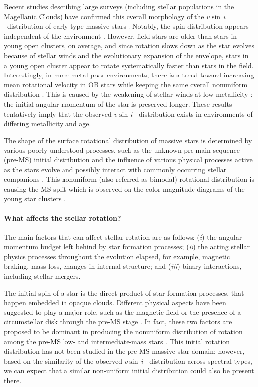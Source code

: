 \documentclass{aa}
\newcommand{\vsini} {$v\sin\,i$}
\begin{document}
Recent studies describing large surveys (including stellar
populations in the Magellanic Clouds) have confirmed this overall
morphology of the \vsini~distribution of early-type massive stars
\citep[e.g.,][]{Dufton_2013,vfts_2013_otype,Holgado_2022}. Notably,
the spin distribution appears independent of the environment
\citep[e.g., Galactic field vs. young stellar
clusters;][]{Wolff_2007,Penny_2009, Huang_2010}. However, field stars
are older than stars in young open clusters, on average, and since
rotation slows down as the star evolves because of stellar winds and the evolutionary expansion of the envelope, stars in a young open cluster appear to rotate
systematically faster than stars in the field.
Interestingly, in more metal-poor environments, there is a trend
toward increasing mean rotational velocity in OB stars while keeping
the same overall nonuniform distribution \citep{Ramachandran_2019}. This is caused by the
  weakening of stellar winds at low metallicity
\citep[e.g.,][]{Vink_2001,mokiem:07}: the initial angular momentum of
the star is preserved longer. These results tentatively imply that the
observed \vsini~ distribution exists in environments of differing metallicity
and age.


The shape of the surface rotational distribution of massive
  stars is determined by various poorly understood processes, such as the unknown pre-main-sequence (pre-MS)
  initial distribution and the influence of various physical processes
  active as the stars evolve and possibly interact with commonly
  occurring \citep[e.g.,][]{Sana_2012, moe_2017, Offner_2022} stellar
  companions \citep[e.g.,][]{packet:81, deMink_2013, vfts_2015_otype}.
This nonuniform (also referred as bimodal) rotational distribution is causing the MS split which is observed on the color magnitude diagrams of the young star clusters \citep[see, for example,][]{Kamann_2023,Wang_2023}.


\paragraph{What affects the stellar rotation?}
The main factors that can affect stellar rotation are as follows: (\emph{i}) the
angular momentum budget left behind by star formation processes;
(\emph{ii}) the acting stellar physics processes throughout the
  evolution elapsed, for example, magnetic braking, mass loss, changes in internal structure; and
(\emph{iii}) binary interactions, including stellar mergers.

The initial spin of a star is the direct product of star formation
processes, that happen embedded in opaque clouds. Different physical
aspects have been suggested to play a major role, such as the magnetic
field or the presence of a circumstellar disk through the pre-MS stage
\citep[e.g.,][]{Rosen_2012}. In fact, these two factors are
proposed to be dominant in producing the nonuniform distribution
of rotation among the pre-MS low- and intermediate-mass stars
\citep{Bastian_2020}. This initial rotation distribution has not been
studied in the pre-MS massive star domain; however, based on the similarity of the observed \vsini~ distribution across spectral types, we can expect that a similar
 non-uniform initial distribution could also be present there.
\end{document}
